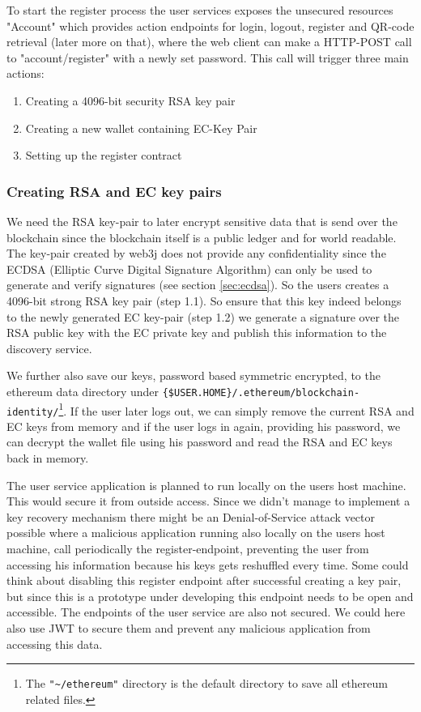 To start the register process the user services exposes the unsecured resources "Account" which provides action endpoints for login, logout, register and QR-code retrieval (later more on that), where the web client can make a HTTP-POST call to "account/register" with a newly set password.
This call will trigger three main actions:

\begin{enumerate}
\item Creating a 4096-bit security RSA key pair
\item Creating a new wallet containing EC-Key Pair 
\item Setting up the register contract 
\end{enumerate}

\subsubsection{Creating RSA and EC key pairs}
We need the RSA key-pair to later encrypt sensitive data that is send over the blockchain since the blockchain itself is a public ledger and for world readable. The key-pair created by web3j does not provide any confidentiality since the ECDSA (Elliptic Curve Digital Signature Algorithm) can only be used to generate and verify signatures (see section \ref{sec:ecdsa}). So the users creates a 4096-bit strong RSA key pair (step 1.1). So ensure that this key indeed belongs to the newly generated EC key-pair (step 1.2) we generate a signature over the RSA public key with the EC private key and publish this information to the discovery service.

We further also save our keys, password based symmetric encrypted, to the ethereum data directory under \lstinline|{$USER.HOME}/.ethereum/blockchain-identity/|\footnote{The \lstinline{"~/ethereum"} directory is the default directory to save all ethereum related files.}. If the user later logs out, we can simply remove the current RSA and EC keys from memory and if the user logs in again, providing his password, we can decrypt the wallet file using his password and read the RSA and EC keys back in memory. 

The user service application is planned to run locally on the users host machine. This would secure it from outside access. Since we didn’t manage to implement a key recovery mechanism there might be an Denial-of-Service attack vector possible where a malicious application running also locally on the users host machine, call periodically the register-endpoint, preventing the user from accessing his information because his keys gets reshuffled every time. Some could think about disabling this register endpoint after successful creating a key pair, but since this is a prototype under developing this endpoint needs to be open and accessible. The endpoints of the user service are also not secured. We could here also use JWT to secure them and prevent any malicious application from accessing this data. 

